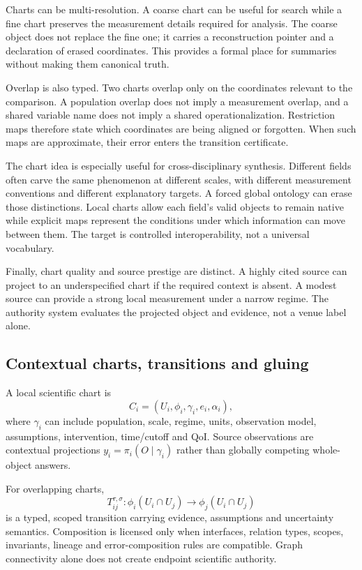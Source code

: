 Charts can be multi-resolution. A coarse chart can be useful for search while a fine chart preserves the measurement details required for analysis. The coarse object does not replace the fine one; it carries a reconstruction pointer and a declaration of erased coordinates. This provides a formal place for summaries without making them canonical truth.

Overlap is also typed. Two charts overlap only on the coordinates relevant to the comparison. A population overlap does not imply a measurement overlap, and a shared variable name does not imply a shared operationalization. Restriction maps therefore state which coordinates are being aligned or forgotten. When such maps are approximate, their error enters the transition certificate.

The chart idea is especially useful for cross-disciplinary synthesis. Different fields often carve the same phenomenon at different scales, with different measurement conventions and different explanatory targets. A forced global ontology can erase those distinctions. Local charts allow each field's valid objects to remain native while explicit maps represent the conditions under which information can move between them. The target is controlled interoperability, not a universal vocabulary.

Finally, chart quality and source prestige are distinct. A highly cited source can project to an underspecified chart if the required context is absent. A modest source can provide a strong local measurement under a narrow regime. The authority system evaluates the projected object and evidence, not a venue label alone.

\subsection{Contextual charts, transitions and gluing}
A local scientific chart is
\begin{equation}C_i=(U_i,\phi_i,\gamma_i,e_i,\alpha_i),\end{equation}
where $\gamma_i$ can include population, scale, regime, units, observation model, assumptions, intervention, time/cutoff and QoI. Source observations are contextual projections $y_i=\pi_i(O\mid\gamma_i)$ rather than globally competing whole-object answers.

For overlapping charts,
\begin{equation}T_{ij}^{\tau,\sigma}:\phi_i(U_i\cap U_j)\rightarrow\phi_j(U_i\cap U_j)\end{equation}
is a typed, scoped transition carrying evidence, assumptions and uncertainty semantics. Composition is licensed only when interfaces, relation types, scopes, invariants, lineage and error-composition rules are compatible. Graph connectivity alone does not create endpoint scientific authority.

